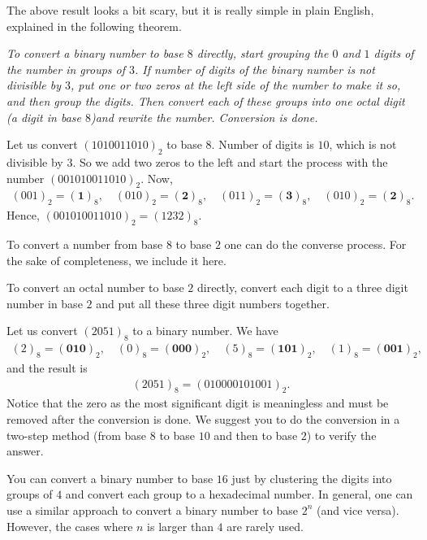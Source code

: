 \documentclass{subfile}
\begin{document}
	The above result looks a bit scary, but it is really simple in plain English, explained in the following theorem.

	\begin{theorem}\slshape
		To convert a binary number to base $8$ directly, start grouping the $0$ and $1$ digits of the number in groups of $3$. If number of digits of the binary number is not divisible by $3$, put one or two zeros at the left side of the number to make it so, and then group the digits. Then convert each of these groups into one octal digit (a digit in base $8$)and rewrite the number. Conversion is done.
	\end{theorem}

	\begin{example}
		Let us convert $({1010011010})_2$ to base $8$. Number of digits is $10$, which is not divisible by $3$. So we add two zeros to the left and start the process with the number $({001010011010})_2$. Now,
		\begin{align*}
			({001})_2 = (\textbf{1})_8, \quad ({010})_2 = (\textbf{2})_8,  \quad ({011})_2 = (\textbf{3})_8, \quad ({010})_2 = (\textbf{2})_8.
		\end{align*}
		Hence, $({001010011010})_2 = ({1232})_8$.
	\end{example}
	To convert a number from base $8$ to base $2$ one can do the converse process. For the sake of completeness, we include it here.
	\begin{theorem}
		To convert an octal number to base $2$ directly, convert each digit to a three digit number in base $2$ and put all these three digit numbers together.
	\end{theorem}

	\begin{example}
		Let us convert $(2051)_8$ to a binary number. We have
		\begin{align*}
			(2)_8=(\textbf{010})_2, \quad (0)_8=(\textbf{000})_2, \quad (5)_8=(\textbf{101})_2, \quad (1)_8=(\textbf{001})_2,
		\end{align*}
		and the result is
		\begin{align*}
			(2051)_8 = (010000101001)_2.
		\end{align*}
		Notice that the zero as the most significant digit is meaningless and must be removed after the conversion is done. We suggest you to do the conversion in a two-step method (from base $8$ to base $10$ and then to base $2$) to verify the answer.
	\end{example}
	You can convert a binary number to base $16$ just by clustering the digits into groups of $4$ and convert each group to a hexadecimal number. In general, one can use a similar approach to convert a binary number to base $2^n$ (and vice versa). However, the cases where $n$ is larger than $4$ are rarely used.
\end{document}
